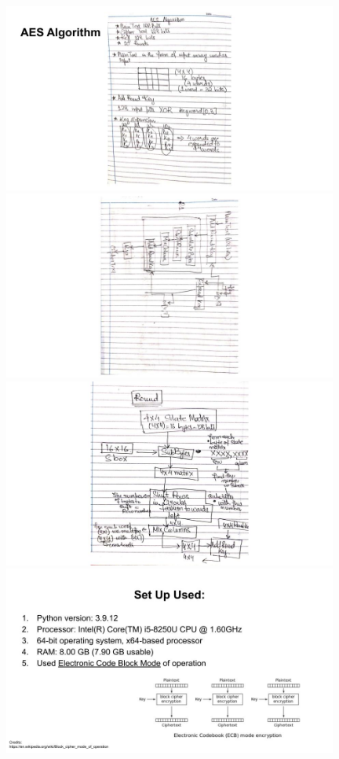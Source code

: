 \documentclass[a4paper]{beamer}
\begin{document}
\includegraphics[width=11cm]{images/Prez_9.jpg}
\includegraphics[width=11cm]{images/Prez_10.jpg}
\includegraphics[width=11cm]{images/Prez_11.jpg}
\includegraphics[width=11cm]{images/Prez_12.jpg}
\end{document}
